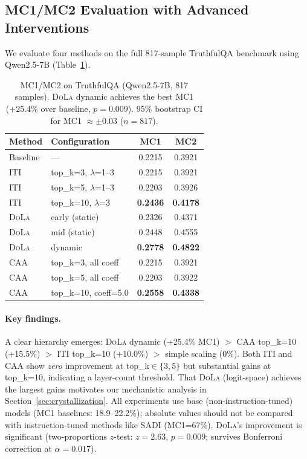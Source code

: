 \documentclass{article}
\newcommand{\iti}{\textsc{ITI}}
\newcommand{\dola}{\textsc{DoLa}}
\newcommand{\caa}{\textsc{CAA}}
\begin{document}
\subsection{MC1/MC2 Evaluation with Advanced Interventions}
\label{sec:mc_results}

We evaluate four methods on the full 817-sample TruthfulQA benchmark using Qwen2.5-7B (Table~\ref{tab:mc_results}).

\begin{table}[t]
\centering
\small
\begin{tabular}{llcc}
\toprule
\textbf{Method} & \textbf{Configuration} & \textbf{MC1} & \textbf{MC2} \\
\midrule
Baseline & --- & 0.2215 & 0.3921 \\
\midrule
\iti{} & top\_k=3, $\lambda$=1--3 & 0.2215 & 0.3921 \\
\iti{} & top\_k=5, $\lambda$=1--3 & 0.2203 & 0.3926 \\
\iti{} & top\_k=10, $\lambda$=3 & \textbf{0.2436} & \textbf{0.4178} \\
\midrule
\dola{} & early (static) & 0.2326 & 0.4371 \\
\dola{} & mid (static) & 0.2448 & 0.4555 \\
\dola{} & dynamic & \textbf{0.2778} & \textbf{0.4822} \\
\midrule
\caa{} & top\_k=3, all coeff & 0.2215 & 0.3921 \\
\caa{} & top\_k=5, all coeff & 0.2203 & 0.3922 \\
\caa{} & top\_k=10, coeff=5.0 & \textbf{0.2558} & \textbf{0.4338} \\
\bottomrule
\end{tabular}
\caption{MC1/MC2 on TruthfulQA (Qwen2.5-7B, 817 samples). \dola{} dynamic achieves the best MC1 (+25.4\% over baseline, $p{=}0.009$). 95\% bootstrap CI for MC1 $\approx \pm 0.03$ ($n{=}817$).}
\label{tab:mc_results}
\end{table}

\paragraph{Key findings.} A clear hierarchy emerges: \dola{} dynamic (+25.4\% MC1) $>$ \caa{} top\_k=10 (+15.5\%) $>$ \iti{} top\_k=10 (+10.0\%) $>$ simple scaling (0\%). Both \iti{} and \caa{} show \emph{zero} improvement at top\_k$\in\{3,5\}$ but substantial gains at top\_k=10, indicating a layer-count threshold. That \dola{} (logit-space) achieves the largest gains motivates our mechanistic analysis in Section~\ref{sec:crystallization}. All experiments use base (non-instruction-tuned) models (MC1 baselines: 18.9--22.2\%); absolute values should not be compared with instruction-tuned methods like SADI \citep{zhang2025sadi} (MC1=67\%). \dola{}'s improvement is significant (two-proportions $z$-test: $z{=}2.63$, $p{=}0.009$; survives Bonferroni correction at $\alpha{=}0.017$).
\end{document}
